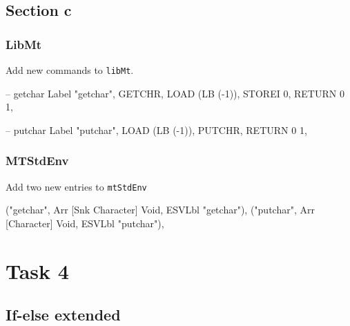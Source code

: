 \documentclass{article}
\begin{document}
\subsection{Section c}

\subsubsection{LibMt}
\begin{flushleft}
Add new commands to \texttt{libMt}.
\end{flushleft}
\begin{code}
-- getchar
    Label "getchar",
    GETCHR,
    LOAD (LB (-1)),
    STOREI 0,
    RETURN 0 1,

-- putchar
    Label "putchar",
    LOAD (LB (-1)),
    PUTCHR,
    RETURN 0 1,
\end{code}

\subsubsection{MTStdEnv}
\begin{flushleft}
Add two new entries to \texttt{mtStdEnv}
\end{flushleft}
\begin{code}
("getchar", Arr [Snk Character] Void,       ESVLbl "getchar"), 
("putchar", Arr [Character] Void,           ESVLbl "putchar"),
\end{code}


\section{Task 4}

\subsection{If-else extended}
\end{document}
